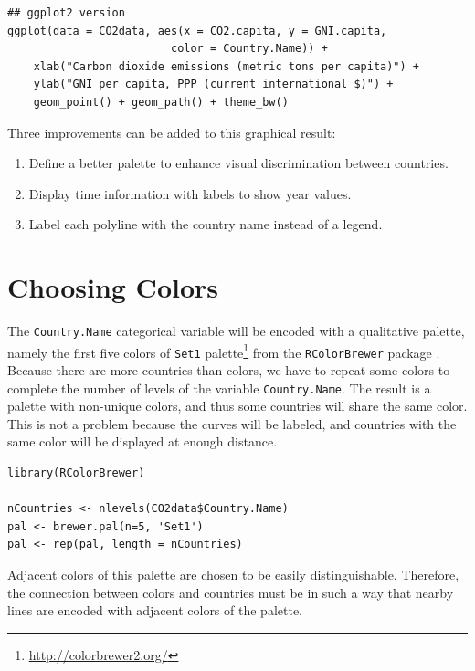 \lstset{language=r,label= ,caption= ,captionpos=b,numbers=none}
\begin{lstlisting}
## ggplot2 version
ggplot(data = CO2data, aes(x = CO2.capita, y = GNI.capita,
                         color = Country.Name)) +
    xlab("Carbon dioxide emissions (metric tons per capita)") +
    ylab("GNI per capita, PPP (current international $)") +
    geom_point() + geom_path() + theme_bw()
\end{lstlisting}

Three improvements can be added to this graphical result: 
\begin{enumerate}
\item Define a better palette to enhance visual discrimination between
countries.
\item Display time information with labels to show year values.
\item Label each polyline with the country name instead of a legend.
\end{enumerate}

\section{Choosing Colors}
\label{sec:org2764a99}
The \texttt{Country.Name} categorical variable will be encoded with a
qualitative palette, namely the first five colors of \texttt{Set1}
palette\footnote{\url{http://colorbrewer2.org/}} from the \texttt{RColorBrewer} package
\cite{Neuwirth2011}. Because there are more countries than colors, we
have to repeat some colors to complete the number of levels of the
variable \texttt{Country.Name}. The result is a palette with non-unique
colors, and thus some countries will share the same color. This is not
a problem because the curves will be labeled, and countries with the
same color will be displayed at enough distance.


\lstset{language=r,label= ,caption= ,captionpos=b,numbers=none}
\begin{lstlisting}
library(RColorBrewer)

nCountries <- nlevels(CO2data$Country.Name)
pal <- brewer.pal(n=5, 'Set1')
pal <- rep(pal, length = nCountries)
\end{lstlisting}

Adjacent colors of this palette are chosen to be easily
distinguishable. Therefore, the connection between colors and
countries must be in such a way that nearby lines are encoded
with adjacent colors of the palette.

